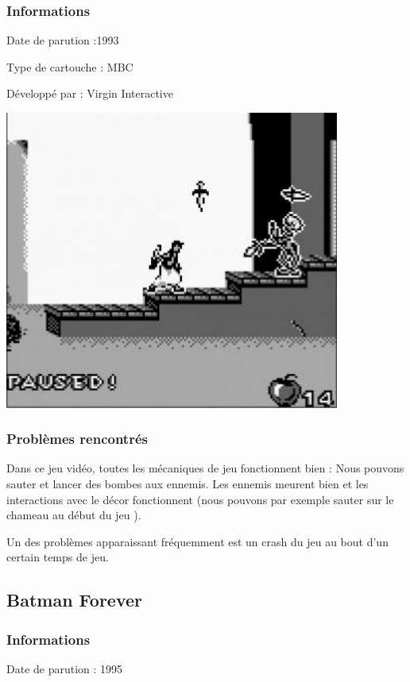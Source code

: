 \documentclass[12pt, a4paper]{article}
\begin{document}
\subsubsection{Informations}

Date de parution :1993

Type de cartouche : MBC

Développé par : Virgin Interactive

\bigskip
\begin{center}
\includegraphics[width=11cm]{aladdinGB.jpg}
\end{center}

\subsubsection{Problèmes rencontrés}
Dans ce jeu vidéo, toutes les mécaniques de jeu fonctionnent bien : Nous pouvons sauter et lancer des bombes aux ennemis. Les ennemis meurent bien et les interactions avec le décor fonctionnent (nous pouvons par exemple sauter sur le chameau au début du jeu ).

Un des problèmes apparaissant fréquemment est un crash du jeu au bout d'un certain temps de jeu.



\pagebreak

\subsection{Batman Forever}

\subsubsection{Informations}
Date de parution : 1995
\end{document}
